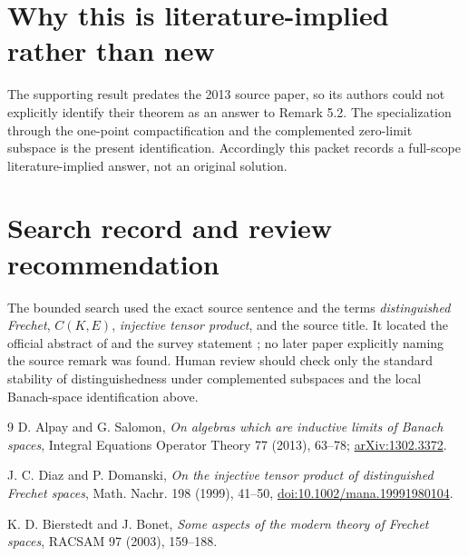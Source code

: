 \documentclass[11pt]{article}
\begin{document}
\section*{Why this is literature-implied rather than new}
The supporting result predates the 2013 source paper, so its authors could
not explicitly identify their theorem as an answer to Remark 5.2.  The
specialization through the one-point compactification and the complemented
zero-limit subspace is the present identification.  Accordingly this packet
records a full-scope literature-implied answer, not an original solution.

\section*{Search record and review recommendation}
The bounded search used the exact source sentence and the terms
\emph{distinguished Frechet}, \(C(K,E)\), \emph{injective tensor product},
and the source title.  It located the official abstract of \cite{DD} and the
survey statement \cite[p.~183]{BB}; no later paper explicitly naming the
source remark was found.  Human review should check only the standard
stability of distinguishedness under complemented subspaces and the local
Banach-space identification above.

\begin{thebibliography}{9}
D. Alpay and G. Salomon,
\emph{On algebras which are inductive limits of Banach spaces},
Integral Equations Operator Theory 77 (2013), 63--78;
\href{https://arxiv.org/abs/1302.3372}{arXiv:1302.3372}.

J. C. Diaz and P. Domanski,
\emph{On the injective tensor product of distinguished Frechet spaces},
Math. Nachr. 198 (1999), 41--50,
\href{https://doi.org/10.1002/mana.19991980104}{doi:10.1002/mana.19991980104}.

K. D. Bierstedt and J. Bonet,
\emph{Some aspects of the modern theory of Frechet spaces},
RACSAM 97 (2003), 159--188.
\end{thebibliography}
\end{document}
